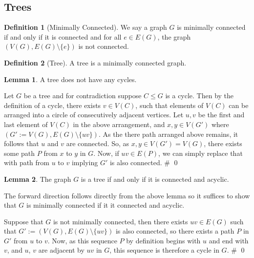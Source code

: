 \documentclass[
]{article}
\theoremstyle{definition}
\newtheorem{lemma}{Lemma}
\theoremstyle{definition}
\newtheorem{definition}{Definition}[section]
\begin{document}
\hypertarget{trees}{%
\subsection{Trees}\label{trees}}

\begin{definition}[Minimally Connected]
  We say a graph \(G\) is minimally connected if and only if it is connected 
  and for all \(e \in E(G)\), the graph \((V(G), E(G) \setminus \{e\})\) is not 
  connected.
\end{definition}

\begin{definition}[Tree]
  A tree is a minimally connected graph.
\end{definition}

\begin{lemma}
  A tree does not have any cycles.
\end{lemma}
\proof

Let \(G\) be a tree and for contradiction suppose \(C \le G\) is a
cycle. Then by the definition of a cycle, there exists \(v \in V(C)\),
such that elements of \(V(C)\) can be arranged into a circle of
consecutively adjacent vertices. Let \(u, v\) be the first and last
element of \(V(C)\) in the above arrangement, and \(x, y \in V(G')\)
where \((G' := V(G), E(G) \setminus \{uv\})\). As the there path
arranged above remains, it follows that \(u\) and \(v\) are connected.
So, as \(x, y \in V(G') = V(G)\), there exists some path \(P\) from
\(x\) to \(y\) in \(G\). Now, if \(uv \in E(P)\), we can simply replace
that with path from \(u\) to \(v\) implying \(G'\) is also connected. \#
\qed

\begin{lemma}\label{tree_acyclic}
  The graph \(G\) is a tree if and only if it is connected and acyclic.
\end{lemma}
\proof

The forward direction follows directly from the above lemma so it
suffices to show that \(G\) is minimally connected if it it connected
and acyclic.

Suppose that \(G\) is not minimally connected, then there exists
\(uv \in E(G)\) such that \(G' := (V(G), E(G) \setminus \{uv\})\) is
also connected, so there exists a path \(P\) in \(G'\) from \(u\) to
\(v\). Now, as this sequence \(P\) by definition begins with \(u\) and
end with \(v\), and \(u\), \(v\) are adjacent by \(uv\) in \(G\), this
sequence is therefore a cycle in \(G\). \# \qed
\end{document}
